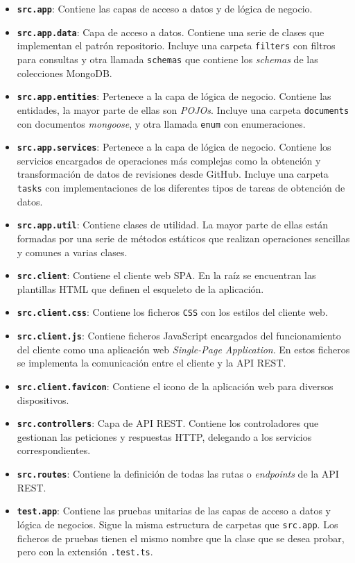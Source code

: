 \begin{itemize}
	\item \textbf{\texttt{src.app}}: Contiene las capas de acceso a datos y de lógica de negocio.
	\item \textbf{\texttt{src.app.data}}: Capa de acceso a datos. Contiene una serie de clases que implementan el patrón repositorio. Incluye una carpeta \texttt{filters} con filtros para consultas y otra llamada \texttt{schemas} que contiene los \textit{schemas} de las colecciones MongoDB.
	\item \textbf{\texttt{src.app.entities}}: Pertenece a la capa de lógica de negocio. Contiene las entidades, la mayor parte de ellas son \textit{POJOs}. Incluye una carpeta \texttt{documents} con documentos \textit{mongoose}, y otra llamada \texttt{enum} con enumeraciones.
	\item \textbf{\texttt{src.app.services}}: Pertenece a la capa de lógica de negocio. Contiene los servicios encargados de operaciones más complejas como la obtención y transformación de datos de revisiones desde GitHub. Incluye una carpeta \texttt{tasks} con implementaciones de los diferentes tipos de tareas de obtención de datos.
	\item \textbf{\texttt{src.app.util}}: Contiene clases de utilidad. La mayor parte de ellas están formadas por una serie de métodos estáticos que realizan operaciones sencillas y comunes a varias clases.
\item \textbf{\texttt{src.client}}: Contiene el cliente web SPA. En la raíz se encuentran las plantillas HTML que definen el esqueleto de la aplicación.
	\item \textbf{\texttt{src.client.css}}: Contiene los ficheros \texttt{CSS} con los estilos del cliente web.
	\item \textbf{\texttt{src.client.js}}: Contiene ficheros JavaScript encargados del funcionamiento del cliente como una aplicación web \textit{Single-Page Application}. En estos ficheros se implementa la comunicación entre el cliente y la API REST.
	\item \textbf{\texttt{src.client.favicon}}: Contiene el icono de la aplicación web para diversos dispositivos.
	\item \textbf{\texttt{src.controllers}}: Capa de API REST. Contiene los controladores que gestionan las peticiones y respuestas HTTP, delegando a los servicios correspondientes.
	\item \textbf{\texttt{src.routes}}: Contiene la definición de todas las rutas o \textit{endpoints} de la API REST.
	\item \textbf{\texttt{test.app}}: Contiene las pruebas unitarias de las capas de acceso a datos y lógica de negocios. Sigue la misma estructura de carpetas que \texttt{src.app}. Los ficheros de pruebas tienen el mismo nombre que la clase que se desea probar, pero con la extensión \texttt{.test.ts}.
\end{itemize}

